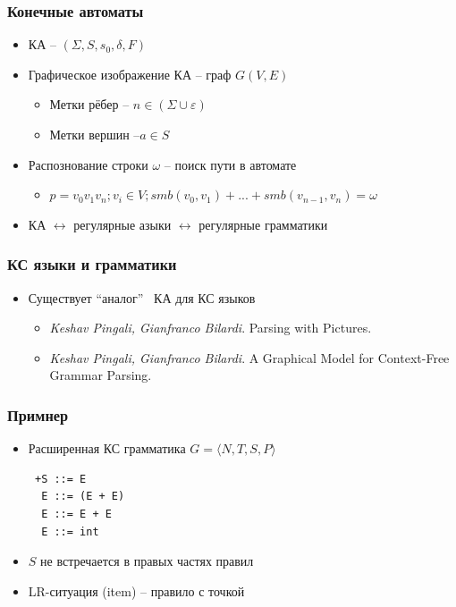 \documentclass{beamer}
\begin{document}
\begin{frame}
    \transwipe[direction=90]
    \frametitle{Конечные автоматы}
    \begin{itemize}
        \item КА -- $(\Sigma, S, s_0, \delta, F)$
        \item Графическое изображение КА -- граф $G(V,E)$
        \begin{itemize}
            \item Метки рёбер -- $n \in (\Sigma \cup {\varepsilon}) $
            \item Метки вершин --$a \in S$ 
        \end{itemize}
        \item Распознование строки $\omega$ -- поиск пути в автомате
        \begin{itemize}
            \item $p=v_0 v_1 v_n; v_i \in V; smb(v_0,v_1) + ... + smb(v_{n-1}, v_n) = \omega$ 
        \end{itemize}
        \item КА $\leftrightarrow$ регулярные азыки $\leftrightarrow$ регулярные грамматики
    \end{itemize}
\end{frame}

\begin{frame}
    \transwipe[direction=90]
    \frametitle{КС языки и грамматики}
    \begin{itemize}
        \item Существует ``аналог'' \  КА для КС языков
        \begin{itemize}
            \item \emph{Keshav Pingali, Gianfranco Bilardi}. Parsing with Pictures.
            \item \emph{Keshav Pingali, Gianfranco Bilardi}. A Graphical Model for Context-Free Grammar Parsing.
        \end{itemize}
    \end{itemize}
\end{frame}

\begin{frame}[fragile]
    \transwipe[direction=90]
    \frametitle{Примнер}
    \begin{itemize}
        \item Расширенная КС грамматика $G = \langle N, T, S, P \rangle$

\begin{verbatim}
 +S ::= E 
  E ::= (E + E)
  E ::= E + E
  E ::= int
\end{verbatim}

        \item $S$ не встречается в правых частях правил
        \item LR-ситуация (item)  -- правило с точкой
    \end{itemize}
\end{frame}
\end{document}
